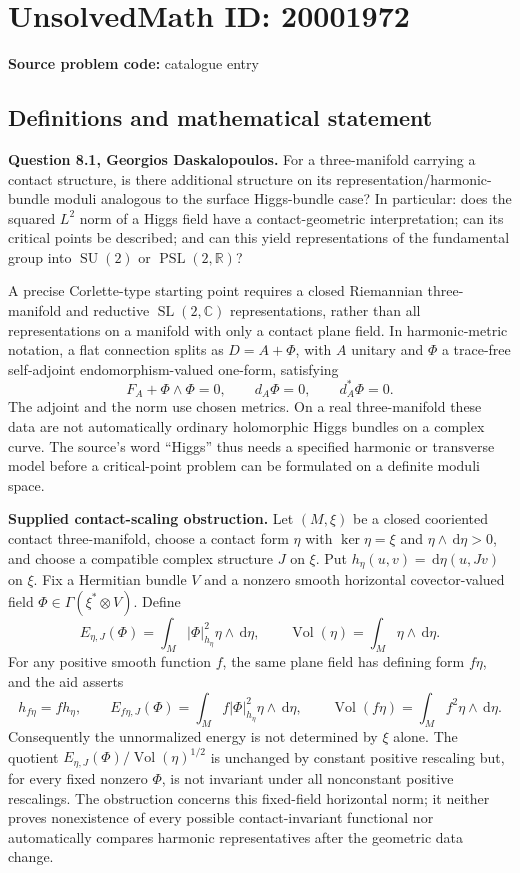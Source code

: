 \documentclass[11pt]{article}
\newcommand{\R}{\mathbb{R}}
\newcommand{\C}{\mathbb{C}}
\newcommand{\dd}{\,\mathrm{d}}
\begin{document}
\section*{UnsolvedMath ID: 20001972}
\textbf{Source problem code:} catalogue entry
\subsection{Definitions and mathematical statement}
\textbf{Question 8.1, Georgios Daskalopoulos.} For a three-manifold carrying a contact structure, is there additional structure on its representation/harmonic-bundle moduli analogous to the surface Higgs-bundle case? In particular: does the squared $L^2$ norm of a Higgs field have a contact-geometric interpretation; can its critical points be described; and can this yield representations of the fundamental group into $\operatorname{SU}(2)$ or $\operatorname{PSL}(2,\R)$?

A precise Corlette-type starting point requires a closed Riemannian three-manifold and reductive $\operatorname{SL}(2,\C)$ representations, rather than all representations on a manifold with only a contact plane field. In harmonic-metric notation, a flat connection splits as $D=A+\Phi$, with $A$ unitary and $\Phi$ a trace-free self-adjoint endomorphism-valued one-form, satisfying
\[
 F_A+\Phi\wedge\Phi=0,\qquad d_A\Phi=0,\qquad d_A^*\Phi=0.
\]
The adjoint and the norm use chosen metrics. On a real three-manifold these data are not automatically ordinary holomorphic Higgs bundles on a complex curve. The source's word ``Higgs'' thus needs a specified harmonic or transverse model before a critical-point problem can be formulated on a definite moduli space.

\textbf{Supplied contact-scaling obstruction.} Let $(M,\xi)$ be a closed cooriented contact three-manifold, choose a contact form $\eta$ with $\ker\eta=\xi$ and $\eta\wedge\dd\eta>0$, and choose a compatible complex structure $J$ on $\xi$. Put $h_\eta(u,v)=\dd\eta(u,Jv)$ on $\xi$. Fix a Hermitian bundle $V$ and a nonzero smooth horizontal covector-valued field $\Phi\in\Gamma(\xi^*\otimes V)$. Define
\[
 E_{\eta,J}(\Phi)=\int_M|\Phi|_{h_\eta}^2\eta\wedge\dd\eta,
 \qquad \operatorname{Vol}(\eta)=\int_M\eta\wedge\dd\eta.
\]
For any positive smooth function $f$, the same plane field has defining form $f\eta$, and the aid asserts
\[
 h_{f\eta}=f h_\eta,\qquad
 E_{f\eta,J}(\Phi)=\int_M f|\Phi|_{h_\eta}^2\eta\wedge\dd\eta,
 \qquad \operatorname{Vol}(f\eta)=\int_M f^2\eta\wedge\dd\eta.
\]
Consequently the unnormalized energy is not determined by $\xi$ alone. The quotient $E_{\eta,J}(\Phi)/\operatorname{Vol}(\eta)^{1/2}$ is unchanged by constant positive rescaling but, for every fixed nonzero $\Phi$, is not invariant under all nonconstant positive rescalings. The obstruction concerns this fixed-field horizontal norm; it neither proves nonexistence of every possible contact-invariant functional nor automatically compares harmonic representatives after the geometric data change.
\end{document}
